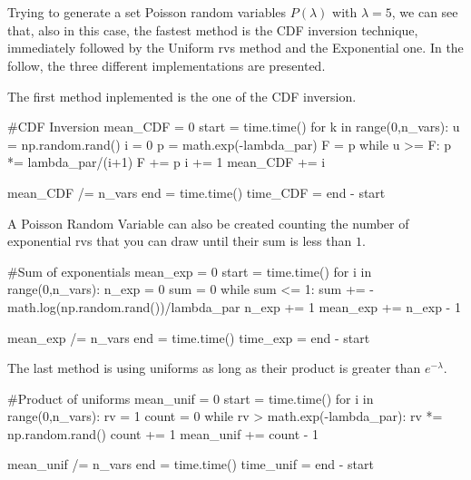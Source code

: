 \documentclass[11pt,a4paper]{article}
\begin{document}
\section{}
Trying to generate a set Poisson random variables $P(\lambda)$ with $\lambda = 5$, we can see that, also in this case, the fastest method is the CDF inversion technique, immediately followed by the Uniform rvs method and the Exponential one.
In the follow, the three different implementations are presented.

The first method inplemented is the one of the CDF inversion.
\begin{python}
#CDF Inversion
mean_CDF = 0
start = time.time()
for k in range(0,n_vars):
    u = np.random.rand()
    i = 0
    p = math.exp(-lambda_par)
    F = p
    while u >= F:
        p *= lambda_par/(i+1)
        F += p
        i += 1
    mean_CDF += i

mean_CDF /= n_vars
end = time.time()
time_CDF = end - start
\end{python}

A Poisson Random Variable can also be created counting the number of exponential rvs that you can draw until their sum is less than $1$.
\begin{python}
#Sum of exponentials
mean_exp = 0
start = time.time()
for i in range(0,n_vars):
    n_exp = 0
    sum = 0
    while sum <= 1:
        sum += -math.log(np.random.rand())/lambda_par
        n_exp += 1
    mean_exp += n_exp - 1

mean_exp /= n_vars
end = time.time()
time_exp = end - start
\end{python}

The last method is using uniforms as long as their product is greater than $e^{-\lambda}$.
\begin{python}
  #Product of uniforms
mean_unif = 0
start = time.time()
for i in range(0,n_vars):
    rv = 1
    count = 0
    while rv > math.exp(-lambda_par):
        rv *= np.random.rand()
        count += 1
    mean_unif += count - 1

mean_unif /= n_vars
end = time.time()
time_unif = end - start
  \end{python}
\end{document}
